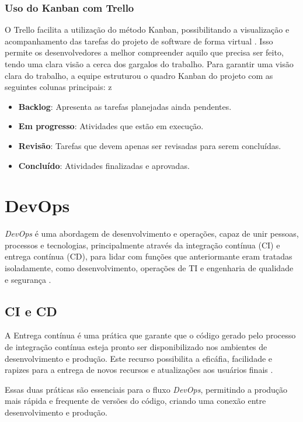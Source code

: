 \subsubsection{Uso do Kanban com Trello}
O Trello facilita a utilização do método Kanban, possibilitando a visualização e acompanhamento das tarefas do projeto de software de forma virtual \cite{campos2023trello}. Isso permite os desenvolvedores a melhor compreender aquilo que precisa ser feito, tendo uma clara visão a cerca dos gargalos do trabalho. Para garantir uma visão clara do trabalho, a equipe estruturou o quadro Kanban do projeto com as seguintes colunas principais:
z
\begin{itemize}
    \item \textbf{Backlog}: Apresenta as tarefas planejadas ainda pendentes.
    \item \textbf{Em progresso}: Atividades que estão em execução.
    \item \textbf{Revisão}: Tarefas que devem apenas ser revisadas para serem concluídas.
    \item \textbf{Concluído}: Atividades finalizadas e aprovadas.
\end{itemize}


\section{DevOps}
\textit{DevOps} é uma abordagem de desenvolvimento e operações, capaz de unir pessoas, processos e tecnologias, principalmente através da integração contínua (CI) e entrega contínua (CD), para lidar com funções que anteriormante eram tratadas isoladamente, como desenvolvimento, operações de TI e engenharia de qualidade e segurança \cite{microsoftdevops}.

\subsection{CI e CD}
A Entrega contínua é uma prática que garante que o código gerado pelo processo de integração contínua esteja pronto ser disponibilizado nos ambientes de desenvolvimento e produção. Este recurso possibilita a eficáfia, facilidade e rapizes para a entrega de novos recursos e atualizações aos usuários finais \cite{gomes2023}.

Essas duas práticas são essenciais para o fluxo \textit{DevOps}, permitindo a produção mais rápida e frequente de versões do código, criando uma conexão entre desenvolvimento e produção.

